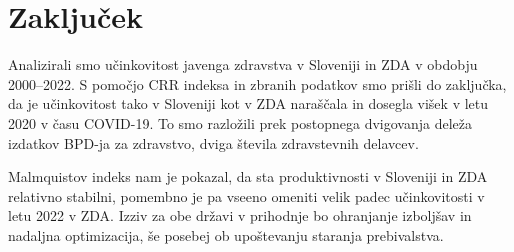 \documentclass[12pt,a4paper]{article}
\theoremstyle{definition}
\begin{document}
\section{Zaključek}

Analizirali smo učinkovitost javenga zdravstva v Sloveniji in ZDA
v obdobju 2000--2022. S pomočjo CRR indeksa in zbranih podatkov
smo prišli do zaključka, da je učinkovitost tako v Sloveniji kot
v ZDA naraščala in dosegla višek v letu 2020 v času COVID-19. To smo
razložili prek postopnega dvigovanja deleža izdatkov BPD-ja za zdravstvo,
dviga števila zdravstevnih delavcev.

Malmquistov indeks nam je pokazal, da sta produktivnosti v Sloveniji
in ZDA relativno stabilni, pomembno je pa vseeno omeniti velik padec
učinkovitosti v letu 2022 v ZDA. Izziv za obe državi v prihodnje bo ohranjanje izboljšav in nadaljna optimizacija,
še posebej ob upoštevanju staranja prebivalstva.

\nocite*{}


\end{document}
